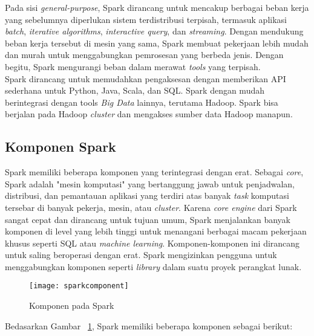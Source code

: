 Pada sisi \textit{general-purpose}, Spark dirancang untuk mencakup berbagai beban kerja yang sebelumnya diperlukan sistem terdistribusi terpisah, termasuk aplikasi \textit{batch}, \textit{iterative algorithms}, \textit{interactive query}, dan \textit{streaming}. Dengan mendukung beban kerja tersebut di mesin yang sama, Spark membuat pekerjaan lebih mudah dan murah untuk menggabungkan pemrosesan yang berbeda jenis. Dengan begitu, Spark mengurangi beban dalam merawat \textit{tools} yang terpisah.\\

Spark dirancang untuk memudahkan pengaksesan dengan memberikan API sederhana untuk Python, Java, Scala, dan SQL. Spark dengan mudah berintegrasi dengan tools \textit{Big Data} lainnya, terutama Hadoop. Spark bisa berjalan pada Hadoop \textit{cluster} dan mengakses sumber data Hadoop manapun.\\





\subsection{Komponen Spark~\cite{holdenkarau:07:ls}}

Spark memiliki beberapa komponen yang terintegrasi dengan erat. Sebagai \textit{core}, Spark adalah "mesin komputasi" yang bertanggung jawab untuk penjadwalan, distribusi, dan pemantauan aplikasi yang terdiri atas banyak \textit{task} komputasi tersebar di banyak pekerja, mesin, atau \textit{cluster}. Karena \textit{core engine} dari Spark sangat cepat dan dirancang untuk tujuan umum, Spark menjalankan banyak komponen di level yang lebih tinggi untuk menangani berbagai macam pekerjaan khusus seperti SQL atau \textit{machine learning}. Komponen-komponen ini dirancang untuk saling beroperasi dengan erat. Spark mengizinkan pengguna untuk menggabungkan komponen seperti \textit{library} dalam suatu proyek perangkat lunak.\\

\begin{figure}[H]
    \centering  
    \texttt{[image: sparkcomponent]}  
    \caption[Komponen pada Spark]{Komponen pada Spark} 
    \label{fig:sparkcomponent} 
\end{figure}

Bedasarkan Gambar ~\ref{fig:sparkcomponent}, Spark memiliki beberapa komponen sebagai berikut:

